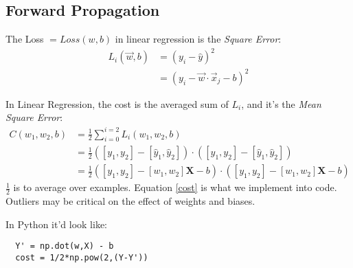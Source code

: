 \subsection{Forward Propagation}

The Loss $= Loss(w,b)$ in linear regression is the \textit{Square Error}:
\begin{align*}
  L_i(\vec{w}, b) &= (y_i - \hat{y})^2\\
  &=(y_i -\vec{w}\cdot{}\vec{x}_j -b)^2
\end{align*}

In Linear Regression, the cost is the averaged sum of $L_i$, and it's the \textit{Mean Square Error}:
\begin{align}
  C(w_1, w_2, b) &= \frac{1}{2} \sum_{i=0}^{i=2} L_i(w_1, w_2, b)\\
  &= \frac{1}{2}([y_1, y_2] - [\hat{y}_1, \hat{y}_2])\cdot{}([y_1, y_2]-[\hat{y}_1, \hat{y}_2])\\
  &=\frac{1}{2}([y_1, y_2] - [w_1, w_2]\mathbf{X}-b)\cdot{}([y_1, y_2] - [w_1,w_2]\mathbf{X} -b) \label{cost}
\end{align}
$\frac{1}{2}$ is to average over examples. Equation \ref{cost} is what we implement into code.
Outliers may be critical on the effect of weights and biases.

In Python it'd look like:
\begin{center}
  \begin{verbatim}
  Y' = np.dot(w,X) - b
  cost = 1/2*np.pow(2,(Y-Y'))
  \end{verbatim}
\end{center}

